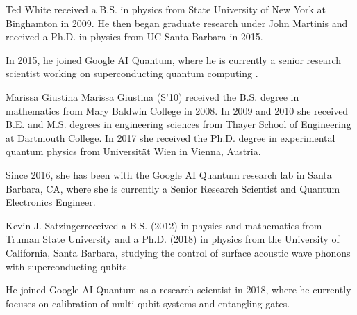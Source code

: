 \documentclass[journal]{IEEEtran}
\begin{document}
\begin{IEEEbiography}{Ted White} received a B.S. in physics from State University of New York at Binghamton in 2009.  He then began graduate research under John Martinis and received a Ph.D. in physics from UC Santa Barbara in 2015.  

In 2015, he joined Google AI Quantum, where he is currently a senior research scientist working on superconducting quantum computing .
\end{IEEEbiography}\vfill
\begin{IEEEbiography}{Marissa Giustina} Marissa Giustina (S’10) received the B.S. degree in mathematics from Mary Baldwin College in 2008. In 2009 and 2010 she received B.E. and M.S. degrees in engineering sciences from Thayer School of Engineering at Dartmouth College. In 2017 she received the Ph.D. degree in experimental quantum physics from Universität Wien in Vienna, Austria.

Since 2016, she has been with the Google AI Quantum research lab in Santa Barbara, CA, where she is currently a Senior Research Scientist and Quantum Electronics Engineer.


\end{IEEEbiography}
\begin{IEEEbiography}{Kevin J. Satzinger}received a B.S. (2012) in physics and mathematics from Truman State University and a Ph.D. (2018) in physics from the University of California, Santa Barbara, studying the control of surface acoustic wave phonons with superconducting qubits. 

He joined Google AI Quantum as a research scientist in 2018, where he currently focuses on calibration of multi-qubit systems and entangling gates.


\end{IEEEbiography}
\end{document}
